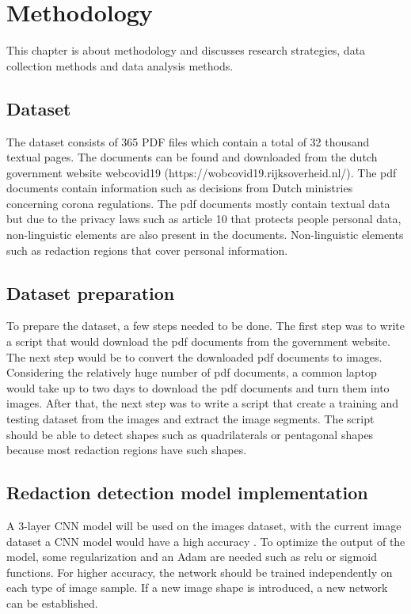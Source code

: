 \documentclass[sigconf,authordraft]{acmart}
\begin{document}
\section{Methodology}

This chapter is about methodology and discusses research strategies, data collection methods and data analysis methods.

\begin{figure} [h]
\centering
 \label{fig:methods}
\end{figure}

\subsection{Dataset}

The dataset consists of 365 PDF files which contain a total of 32 thousand textual pages. The documents can be found and downloaded from the dutch government website webcovid19 (https://wobcovid19.rijksoverheid.nl/). The pdf documents contain information such as decisions from Dutch ministries concerning corona regulations. The pdf documents mostly contain textual data but due to the privacy laws such as article 10 \cite{artikel10} that protects people personal data, non-linguistic elements are also present in the documents. Non-linguistic elements such as redaction regions that cover personal information.  

\subsection{Dataset preparation}

To prepare the dataset, a few steps needed to be done. The first step was to write a script that would download the pdf documents from the government website. The next step would be to convert the downloaded pdf documents to images. Considering the relatively huge number of pdf documents, a common laptop would take up to two days to download the pdf documents and turn them into images. After that, the next step was to write a script that create a training and testing dataset from the images and extract the image segments. The script should be able to detect shapes such as quadrilaterals or pentagonal shapes because most redaction regions have such shapes.  

\subsection{Redaction detection model implementation}
A 3-layer CNN model will be used on the images dataset, with the current image dataset a CNN model would have a high accuracy \cite{CNN} . To optimize the output of the model, some regularization and an Adam are needed such as relu or sigmoid functions. For higher accuracy, the network should be trained independently on each type of image sample. If a new image shape is introduced, a new network can be established. 
\end{document}
